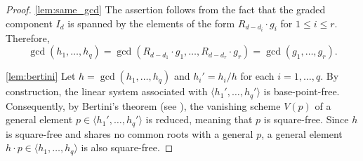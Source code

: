 \documentclass[a4paper, 11pt]{amsart}
\numberwithin{theorem}{section}
\theoremstyle{definition}
\numberwithin{equation}{section}
\begin{document}
\begin{proof}
\eqref{lem:same_gcd} The assertion follows from the fact that the graded component $I_d$ is spanned by the elements of the form $R_{d-d_i} \cdot g_i$ for $1 \leq i \leq r$. 
Therefore,
\[
\gcd(h_1, \dots, h_q) = \gcd(R_{d-d_1}\cdot g_1, \dots, R_{d-d_r}\cdot g_r) = \gcd(g_1, \dots, g_r).
\]
    
\eqref{lem:bertini} Let $h = \gcd(h_1, \dots, h_q)$ and $h_i' = h_i/h$ for each $i = 1, \dots, q$. 
By construction, the linear system associated with $\langle h_1', \dots, h_q'\rangle$ is base-point-free. 
Consequently, by Bertini's theorem (see \cite[Chapter III Corollary~10.9]{hartshorne}), the vanishing scheme $V(p)$ of a general element $p \in \langle h_1', \dots, h_q'\rangle$ is reduced, meaning that $p$ is square-free.
Since $h$ is square-free and shares no common roots with a general $p$, a general element $h \cdot p \in \langle h_1, \dots, h_q \rangle$ is also square-free.
\end{proof}
\end{document}
